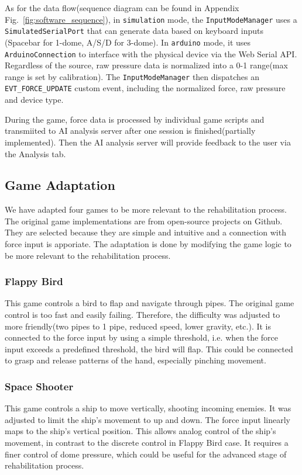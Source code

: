 As for the data flow(sequence diagram can be found in Appendix Fig.~\ref{fig:software_sequence}), in \texttt{simulation} mode, the \texttt{InputModeManager} uses a \texttt{SimulatedSerialPort} that can generate data based on keyboard inputs (Spacebar for 1-dome, A/S/D for 3-dome).
 In \texttt{arduino} mode, it uses \texttt{ArduinoConnection} to interface with the physical device via the Web Serial API.
Regardless of the source, raw pressure data is normalized into a 0-1 range(max range is set by calibration).
The \texttt{InputModeManager} then dispatches an \texttt{EVT\_FORCE\_UPDATE} custom event, including the normalized force, raw pressure and device type.

During the game, force data is processed by individual game scripts 
and transmiited to AI analysis server after one session is finished(partially implemented).
Then the AI analysis server will provide feedback to the user via the Analysis tab.

\subsection{Game Adaptation}
We have adapted four games to be more relevant to the rehabilitation process. 
The original game implementations are from open-source projects on Github.
They are selected because they are simple and intuitive and a connection with force input is apporiate.
The adaptation is done by modifying the game logic to be more relevant to the rehabilitation process.

\subsubsection{Flappy Bird}
This game controls a bird to flap and navigate through pipes. The original game control is too fast and easily failing. 
Therefore, the difficulty was adjusted to more friendly(two pipes to 1 pipe, reduced speed, lower gravity, etc.).
It is connected to the force input by using a simple threshold, i.e. when the force input exceeds a predefined threshold, the bird will flap.
This could be connected to grasp and release patterns of the hand, especially pinching movement.

\subsubsection{Space Shooter}
This game controls a ship to move vertically, shooting incoming enemies. It was adjusted to limit the ship's movement to up and down.
The force input linearly maps to the ship's vertical position. This allows analog control of the ship's movement, 
in contrast to the discrete control in Flappy Bird case. It requires a finer control of dome pressure, 
which could be useful for the advanced stage of rehabilitation process.


